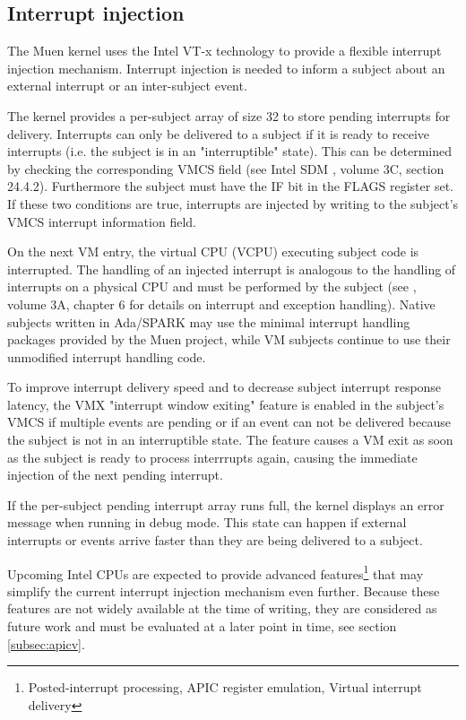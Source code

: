 \subsection{Interrupt injection}\label{subsec:int-injection}
The Muen kernel uses the Intel VT-x technology to provide a flexible interrupt
injection mechanism. Interrupt injection is needed to inform a subject about an
external interrupt or an inter-subject event.

The kernel provides a per-subject array of size 32 to store pending interrupts
for delivery.  Interrupts can only be delivered to a subject if it is ready to
receive interrupts (i.e. the subject is in an "interruptible" state). This can
be determined by checking the corresponding VMCS field (see Intel SDM
\cite{IntelSDM}, volume 3C, section 24.4.2). Furthermore the subject must have
the IF bit in the FLAGS register set. If these two conditions are true,
interrupts are injected by writing to the subject's VMCS interrupt information
field.

On the next VM entry, the virtual CPU (VCPU) executing subject code
is interrupted. The handling of an injected interrupt is analogous to the
handling of interrupts on a physical CPU and must be performed by the subject
(see \cite{IntelSDM}, volume 3A, chapter 6 for details on interrupt and
exception handling). Native subjects written in Ada/SPARK may use the minimal
interrupt handling packages provided by the Muen project, while VM subjects
continue to use their unmodified interrupt handling code.

To improve interrupt delivery speed and to decrease subject interrupt response
latency, the VMX "interrupt window exiting" feature is enabled in the subject's
VMCS if multiple events are pending or if an event can not be delivered because
the subject is not in an interruptible state. The feature causes a VM exit as
soon as the subject is ready to process interrrupts again, causing the immediate
injection of the next pending interrupt.

If the per-subject pending interrupt array runs full, the kernel displays an
error message when running in debug mode. This state can happen if external
interrupts or events arrive faster than they are being delivered to a subject.

Upcoming Intel CPUs are expected to provide advanced
features\footnote{Posted-interrupt processing, APIC register emulation, Virtual
interrupt delivery} that may simplify the current interrupt injection mechanism
even further. Because these features are not widely available at the time of
writing, they are considered as future work and must be evaluated at a later
point in time, see section \ref{subsec:apicv}.
